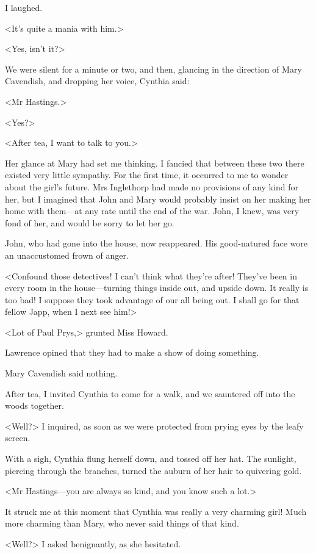  I laughed. 

 <It's quite a mania with him.> 

 <Yes, isn't it?> 

 We were silent for a minute or two, and then, glancing in the direction of Mary Cavendish, and dropping her voice, Cynthia said: 

 <Mr Hastings.> 

 <Yes?> 

 <After tea, I want to talk to you.> 

 Her glance at Mary had set me thinking. I fancied that between these two there existed very little sympathy. For the first time, it occurred to me to wonder about the girl's future. Mrs Inglethorp had made no provisions of any kind for her, but I imagined that John and Mary would probably insist on her making her home with them—at any rate until the end of the war. John, I knew, was very fond of her, and would be sorry to let her go. 

 John, who had gone into the house, now reappeared. His good-natured face wore an unaccustomed frown of anger. 

 <Confound those detectives! I can't think what they're after! They've been in every room in the house—turning things inside out, and upside down. It really is too bad! I suppose they took advantage of our all being out. I shall go for that fellow Japp, when I next see him!> 

 <Lot of Paul Prys,> grunted Miss Howard. 

 Lawrence opined that they had to make a show of doing something. 

 Mary Cavendish said nothing. 

 After tea, I invited Cynthia to come for a walk, and we sauntered off into the woods together. 

 <Well?> I inquired, as soon as we were protected from prying eyes by the leafy screen. 

 With a sigh, Cynthia flung herself down, and tossed off her hat. The sunlight, piercing through the branches, turned the auburn of her hair to quivering gold. 

 <Mr Hastings—you are always so kind, and you know such a lot.> 

 It struck me at this moment that Cynthia was really a very charming girl! Much more charming than Mary, who never said things of that kind. 

 <Well?> I asked benignantly, as she hesitated. 

